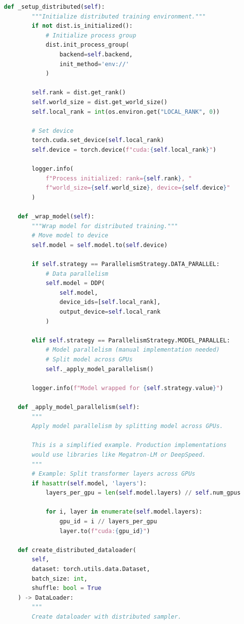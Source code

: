 \begin{lstlisting}[language=Python, caption={Distributed Training Framework}]
    def _setup_distributed(self):
        """Initialize distributed training environment."""
        if not dist.is_initialized():
            # Initialize process group
            dist.init_process_group(
                backend=self.backend,
                init_method='env://'
            )

        self.rank = dist.get_rank()
        self.world_size = dist.get_world_size()
        self.local_rank = int(os.environ.get("LOCAL_RANK", 0))

        # Set device
        torch.cuda.set_device(self.local_rank)
        self.device = torch.device(f"cuda:{self.local_rank}")

        logger.info(
            f"Process initialized: rank={self.rank}, "
            f"world_size={self.world_size}, device={self.device}"
        )

    def _wrap_model(self):
        """Wrap model for distributed training."""
        # Move model to device
        self.model = self.model.to(self.device)

        if self.strategy == ParallelismStrategy.DATA_PARALLEL:
            # Data parallelism
            self.model = DDP(
                self.model,
                device_ids=[self.local_rank],
                output_device=self.local_rank
            )

        elif self.strategy == ParallelismStrategy.MODEL_PARALLEL:
            # Model parallelism (manual implementation needed)
            # Split model across GPUs
            self._apply_model_parallelism()

        logger.info(f"Model wrapped for {self.strategy.value}")

    def _apply_model_parallelism(self):
        """
        Apply model parallelism by splitting model across GPUs.

        This is a simplified example. Production implementations
        would use libraries like Megatron-LM or DeepSpeed.
        """
        # Example: Split transformer layers across GPUs
        if hasattr(self.model, 'layers'):
            layers_per_gpu = len(self.model.layers) // self.num_gpus

            for i, layer in enumerate(self.model.layers):
                gpu_id = i // layers_per_gpu
                layer.to(f"cuda:{gpu_id}")

    def create_distributed_dataloader(
        self,
        dataset: torch.utils.data.Dataset,
        batch_size: int,
        shuffle: bool = True
    ) -> DataLoader:
        """
        Create dataloader with distributed sampler.


\end{lstlisting}
